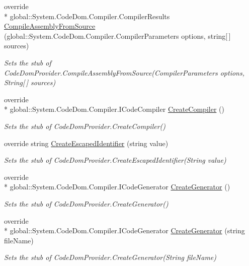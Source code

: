 \begin{DoxyCompactItemize}
override \\*
global\-::\-System.\-Code\-Dom.\-Compiler.\-Compiler\-Results \hyperlink{class_system_1_1_code_dom_1_1_compiler_1_1_fakes_1_1_stub_code_dom_provider_a28b35a1792d1658420c68b59e21ffd81}{Compile\-Assembly\-From\-Source} (global\-::\-System.\-Code\-Dom.\-Compiler.\-Compiler\-Parameters options, string\mbox{[}$\,$\mbox{]} sources)
\begin{DoxyCompactList}\small\item\em Sets the stub of Code\-Dom\-Provider.\-Compile\-Assembly\-From\-Source(\-Compiler\-Parameters options, String\mbox{[}$\,$\mbox{]} sources)\end{DoxyCompactList}\item 
override \\*
global\-::\-System.\-Code\-Dom.\-Compiler.\-I\-Code\-Compiler \hyperlink{class_system_1_1_code_dom_1_1_compiler_1_1_fakes_1_1_stub_code_dom_provider_ad8f21d0a780bb1703e7804c34fe33850}{Create\-Compiler} ()
\begin{DoxyCompactList}\small\item\em Sets the stub of Code\-Dom\-Provider.\-Create\-Compiler()\end{DoxyCompactList}\item 
override string \hyperlink{class_system_1_1_code_dom_1_1_compiler_1_1_fakes_1_1_stub_code_dom_provider_a3b710c55cb73e24f0e6acc62e1818dd6}{Create\-Escaped\-Identifier} (string value)
\begin{DoxyCompactList}\small\item\em Sets the stub of Code\-Dom\-Provider.\-Create\-Escaped\-Identifier(\-String value)\end{DoxyCompactList}\item 
override \\*
global\-::\-System.\-Code\-Dom.\-Compiler.\-I\-Code\-Generator \hyperlink{class_system_1_1_code_dom_1_1_compiler_1_1_fakes_1_1_stub_code_dom_provider_af244ea1e88bd3aee670e5f80468d6e4f}{Create\-Generator} ()
\begin{DoxyCompactList}\small\item\em Sets the stub of Code\-Dom\-Provider.\-Create\-Generator()\end{DoxyCompactList}\item 
override \\*
global\-::\-System.\-Code\-Dom.\-Compiler.\-I\-Code\-Generator \hyperlink{class_system_1_1_code_dom_1_1_compiler_1_1_fakes_1_1_stub_code_dom_provider_ab8f04fb09111f2afce3c4e9210ded1ae}{Create\-Generator} (string file\-Name)
\begin{DoxyCompactList}\small\item\em Sets the stub of Code\-Dom\-Provider.\-Create\-Generator(\-String file\-Name)\end{DoxyCompactList}\item 

\end{DoxyCompactItemize}
